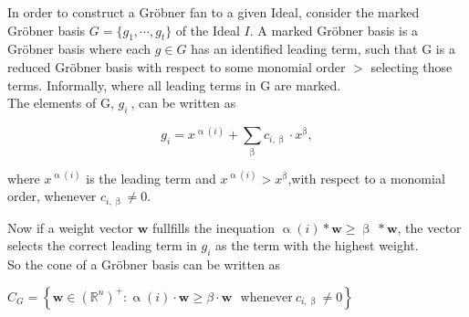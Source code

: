In order to construct a Gröbner fan to a given Ideal, consider the marked Gröbner basis $G = \lbrace g_{1},\cdots,g_{t}\rbrace $ of the Ideal $I$.
A marked Gröbner basis is a Gröbner basis where each $g \in G$ has an identified leading term, such that G is a reduced Gröbner basis with respect to some monomial order $>$ selecting those terms.
Informally, where all leading terms in G are marked.\\
\newline
The elements of G, $g_{i}~$, can be written as
\begin{center}
\[ g_{i} = x^{\upalpha\left( i\right) } +  \sum_{\upbeta} c_{i,\upbeta} \cdot x^{\upbeta}, \] 
\end{center}
where $ x^{\upalpha\left( i\right) }$ is the leading term and $ x^{\upalpha\left( i\right) } > x^{\upbeta} $,with respect to a monomial order, whenever $c_{i,\upbeta} \neq 0 $.

Now if a weight vector $\textbf{w}$ fullfills the inequation
$\upalpha\left( i\right) \ast \textbf{w} \geq \upbeta~\ast\textbf{w}$, the vector selects the correct leading term in $g_{i}$ as the term with the highest weight.\\

So the cone of a Gröbner basis can be written as \cite{coxOshea}\\
\begin{center}
$C_{G} = \left\lbrace \textbf{w} \in \left(\mathbb{R}^{n}\right)^{+} : \upalpha\left( i\right) \cdot \textbf{w} \geq \beta \cdot \textbf{w}~~~ \textrm{whenever}~ c_{i,\upbeta} \neq 0 \right\rbrace   $
\end{center}


